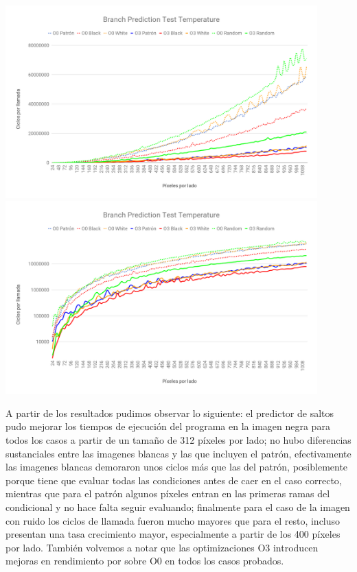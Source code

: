 \begin{center}

	\includegraphics[width=0.9\textwidth]{imagenes/branchprediction/branchpredictionLIN.png} \\
	\includegraphics[width=0.9\textwidth]{imagenes/branchprediction/branchpredictionLOG.png}

\end{center}

A partir de los resultados pudimos observar lo siguiente: el predictor de saltos pudo mejorar los tiempos de ejecución del programa en la imagen negra para todos los casos a partir de un tamaño de 312 píxeles por lado; no hubo diferencias sustanciales entre las imagenes blancas y las que incluyen el patrón, efectivamente las imagenes blancas demoraron unos ciclos más que las del patrón, posiblemente porque tiene que evaluar todas las condiciones antes de caer en el caso correcto, mientras que para el patrón algunos píxeles entran en las primeras ramas del condicional y no hace falta seguir evaluando; finalmente para el caso de la imagen con ruido los ciclos de llamada fueron mucho mayores que para el resto, incluso presentan una tasa crecimiento mayor, especialmente a partir de los 400 píxeles por lado. También volvemos a notar que las optimizaciones O3 introducen mejoras en rendimiento por sobre O0 en todos los casos probados.


